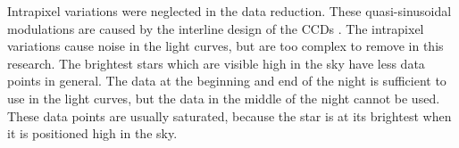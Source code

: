 \documentclass{aa}
\begin{document}


Intrapixel variations were neglected in the data reduction.
%
These quasi-sinusoidal modulations are caused by the interline design of the CCDs \citep{Talens_2018}.
%
The intrapixel variations cause noise in the light curves, but are too complex to remove in this research.
%
The brightest stars which are visible high in the sky have less data points in general.
%
The data at the beginning and end of the night is sufficient to use in the light curves, but the data in the middle of the night cannot be used.
%
These data points are usually saturated, because the star is at its brightest when it is positioned high in the sky.

\end{document}
